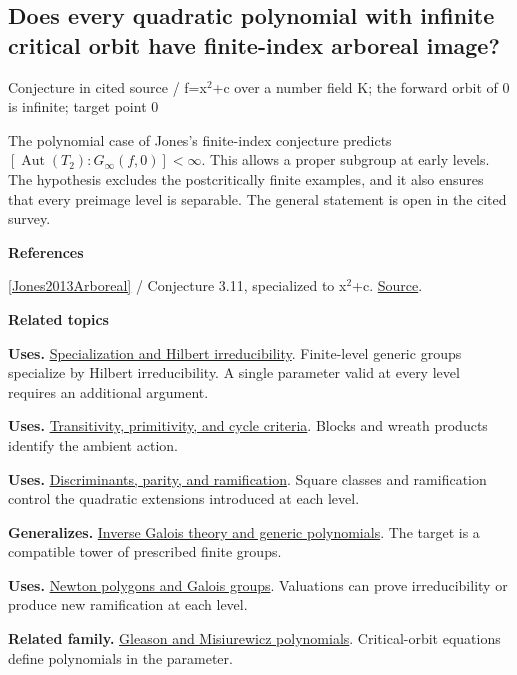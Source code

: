 \documentclass[11pt,a4paper,oneside,openany]{book}
\newenvironment{sources}{\par\smallskip\begingroup\footnotesize\color{atlasgray}\leftskip=10pt\setlength{\parskip}{2pt}}{\par\endgroup\smallskip}
\begin{document}
\subsection*{Does every quadratic polynomial with infinite critical orbit have finite-index arboreal image?}
{\small\sffamily\color{atlasgold}Conjecture in cited source / f=x\ensuremath{{}^2}+c over a number field K; the forward orbit of 0 is infinite; target point 0}\par\smallskip
\color{black} The polynomial case of Jones's finite-index conjecture predicts \([\operatorname{Aut}(T_2):G_\infty(f,0)]<\infty\). This allows a proper subgroup at early levels. The hypothesis excludes the postcritically finite examples, and it also ensures that every preimage level is separable. The general statement is open in the cited survey.\par
\begin{sources}
\textbf{References}\par\smallskip
\noindent\hyperlink{ref:Jones2013Arboreal}{[Jones2013Arboreal]} / Conjecture 3.11, specialized to x\ensuremath{{}^2}+c.  \href{https://www.numdam.org/articles/10.5802/pmb.a-154/}{Source}.\par
\end{sources}\color{black}
\par\medskip\begingroup\footnotesize\setlength{\parskip}{1pt}\textbf{\sffamily\color{atlasgreen}Related topics}\par
\color{black}\textbf{Uses.} \hyperlink{article:specialization}{Specialization and Hilbert irreducibility}. Finite-level generic groups specialize by Hilbert irreducibility. A single parameter valid at every level requires an additional argument.\par
\color{black}\textbf{Uses.} \hyperlink{article:permutation-groups}{Transitivity, primitivity, and cycle criteria}. Blocks and wreath products identify the ambient action.\par
\color{black}\textbf{Uses.} \hyperlink{article:discriminants}{Discriminants, parity, and ramification}. Square classes and ramification control the quadratic extensions introduced at each level.\par
\color{black}\textbf{Generalizes.} \hyperlink{article:inverse-galois}{Inverse Galois theory and generic polynomials}. The target is a compatible tower of prescribed finite groups.\par
\color{black}\textbf{Uses.} \hyperlink{article:newton-polygons}{Newton polygons and Galois groups}. Valuations can prove irreducibility or produce new ramification at each level.\par
\color{black}\textbf{Related family.} \hyperlink{article:critical-parameter-polynomials}{Gleason and Misiurewicz polynomials}. Critical-orbit equations define polynomials in the parameter.\par
\endgroup
\end{document}
